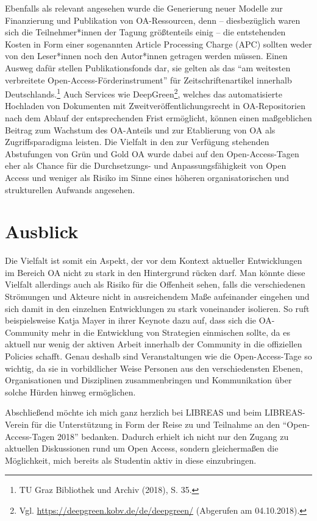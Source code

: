 \documentclass[a4paper,
fontsize=11pt,
oneside,
numbers=noperiodatend,
parskip=half-,
bibliography=totoc,
final
]{scrartcl}
\begin{document}
Ebenfalls als relevant angesehen wurde die Generierung neuer Modelle zur
Finanzierung und Publikation von OA-Ressourcen, denn -- diesbezüglich
waren sich die Teilnehmer*innen der Tagung größtenteils einig -- die
entstehenden Kosten in Form einer sogenannten Article Processing Charge
(APC) sollten weder von den Leser*innen noch den Autor*innen getragen
werden müssen. Einen Ausweg dafür stellen Publikationsfonds dar, sie
gelten als das \enquote{am weitesten verbreitete
Open-Access-Förderinstrument} für Zeitschriftenartikel innerhalb
Deutschlands.\footnote{TU Graz Bibliothek und Archiv (2018), S. 35.}
Auch Services wie DeepGreen\footnote{Vgl.
  \url{https://deepgreen.kobv.de/de/deepgreen/} (Abgerufen am
  04.10.2018).}, welches das automatisierte Hochladen von Dokumenten mit
Zweitveröffentlichungsrecht in OA-Repositorien nach dem Ablauf der
entsprechenden Frist ermöglicht, können einen maßgeblichen Beitrag zum
Wachstum des OA-Anteils und zur Etablierung von OA als Zugriffsparadigma
leisten. Die Vielfalt in den zur Verfügung stehenden Abstufungen von
Grün und Gold OA wurde dabei auf den Open-Access-Tagen eher als Chance
für die Durchsetzungs- und Anpassungsfähigkeit von Open Access und
weniger als Risiko im Sinne eines höheren organisatorischen und
strukturellen Aufwands angesehen.

\hypertarget{ausblick}{%
\section{Ausblick}\label{ausblick}}

Die Vielfalt ist somit ein Aspekt, der vor dem Kontext aktueller
Entwicklungen im Bereich OA nicht zu stark in den Hintergrund rücken
darf. Man könnte diese Vielfalt allerdings auch als Risiko für die
Offenheit sehen, falls die verschiedenen Strömungen und Akteure nicht in
ausreichendem Maße aufeinander eingehen und sich damit in den einzelnen
Entwicklungen zu stark voneinander isolieren. So ruft beispielsweise
Katja Mayer in ihrer Keynote dazu auf, dass sich die OA-Community mehr
in die Entwicklung von Strategien einmischen sollte, da es aktuell nur
wenig der aktiven Arbeit innerhalb der Community in die offiziellen
Policies schafft. Genau deshalb sind Veranstaltungen wie die
Open-Access-Tage so wichtig, da sie in vorbildlicher Weise Personen aus
den verschiedensten Ebenen, Organisationen und Disziplinen
zusammenbringen und Kommunikation über solche Hürden hinweg ermöglichen.

Abschließend möchte ich mich ganz herzlich bei LIBREAS und beim
LIBREAS-Verein für die Unterstützung in Form der Reise zu und Teilnahme
an den \enquote{Open-Access-Tagen 2018} bedanken. Dadurch erhielt ich
nicht nur den Zugang zu aktuellen Diskussionen rund um Open Access,
sondern gleichermaßen die Möglichkeit, mich bereits als Studentin aktiv
in diese einzubringen.
\end{document}
